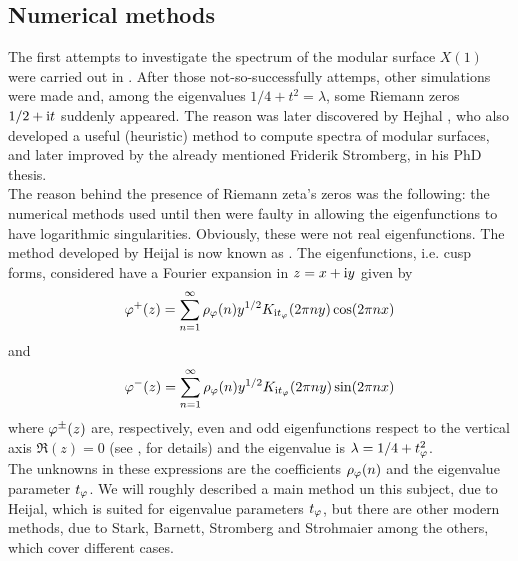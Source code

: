 \subsection{Numerical methods}

The first attempts to investigate the spectrum of the modular surface $X(1)$ were carried out in \cite{Cart:comput}. After those not-so-successfully attemps, other simulations were made and, among the eigenvalues $1/4+t^{2}=\lambda$, some Riemann zeros $1/2+\mathrm{i} t$ suddenly appeared. The reason was later discovered by Hejhal \cite{Hejhal:triang}, who also developed a useful (heuristic) method to compute spectra of modular surfaces, and later improved by the already mentioned Friderik Stromberg, in his PhD thesis.\\

The reason behind the presence of Riemann zeta's zeros was the following: the numerical methods used until then were faulty in allowing the eigenfunctions to have logarithmic singularities. Obviously, these were not real eigenfunctions. The method developed by Heijal is now known as . The eigenfunctions, i.e. cusp forms, considered have a Fourier expansion in $z=x+\mathrm{i} y$ given by 
\[
\varphi^{+}(z)=\sum_{n=1}^{\infty}\rho_{\varphi}(n)y^{1/2} K_{\mathrm{i} t_{\varphi}}(2\pi ny)\cos(2\pi nx)
\]
and
\[
\varphi^{-}(z)=\sum_{n=1}^{\infty}\rho_{\varphi}(n)y^{1/2} K_{\mathrm{i} t_{\varphi}}(2\pi ny)\sin(2\pi nx)
\]
where $\varphi^{\pm}(z)$ are, respectively, even and odd eigenfunctions respect to the vertical axis $\Re(z)=0$ (see \cite{Stark:mod_forms},\cite{Sarnak:review} for details) and the eigenvalue is $\lambda=1/4+t^{2}_{\varphi}$.\\
The unknowns in these expressions are the coefficients $\rho_{\varphi}(n)$ and the eigenvalue parameter $t_{\varphi}$. We will roughly described a main method un this subject, due to Heijal, which is suited for  eigenvalue parameters $t_{\varphi}$, but there are other modern methods, due to Stark, Barnett, Stromberg and Strohmaier among the others, which cover different cases.\\


